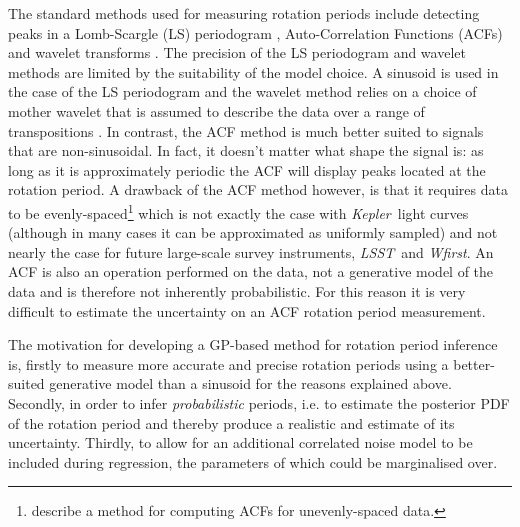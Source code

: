 \documentclass[useAMS, usenatbib, preprint, 12pt]{aastex}
\newcommand{\Kepler}{{\it Kepler}}
\newcommand{\LSST}{{\it LSST}}
\newcommand{\Wfirst}{{\it Wfirst}}
\newcommand{\eg}{{\it e.g.}}
\begin{document}
The standard methods used for measuring rotation periods include detecting
peaks in a Lomb-Scargle \citep{Lomb1976, Scargle1982} (LS) periodogram
\citep[e.g.][]{Reinhold2013}, Auto-Correlation Functions (ACFs)
\citep{Mcquillan2013} and wavelet transforms \citep{Garcia2014}.
The precision of the LS periodogram and wavelet methods are limited by the
suitability of the model choice.
A sinusoid is used in the case of the LS periodogram and the wavelet method
relies on a choice of mother wavelet that is assumed to describe the data over
a range of transpositions \citep[see, \eg][]{Carter2010}.
In contrast, the ACF method is much better suited to signals that are
non-sinusoidal.
In fact, it doesn't matter what shape the signal is: as long as it is
approximately periodic the ACF will display peaks located at the rotation
period.
A drawback of the ACF method however, is that it requires data to be
evenly-spaced\footnote{\citet{Edelson1988} describe a method for computing
ACFs for unevenly-spaced data.} which is not exactly the case with \Kepler\
light curves (although in many cases it can be approximated as uniformly
sampled) and not nearly the case for future large-scale survey instruments,
\LSST\ and \Wfirst.
An ACF is also an operation performed on the data, not a generative model of
the data and is therefore not inherently probabilistic.
For this reason it is very difficult to estimate the uncertainty on an ACF
rotation period measurement.

The motivation for developing a GP-based method for rotation period inference
is, firstly to measure more accurate and precise rotation periods using a
better-suited generative model than a sinusoid for the reasons explained
above.
Secondly, in order to infer {\it probabilistic} periods, i.e. to estimate the
posterior PDF of the rotation period and thereby produce a realistic and
estimate of its uncertainty.
Thirdly, to allow for an additional correlated noise model to be included
during regression, the parameters of which could be marginalised over.
\end{document}
